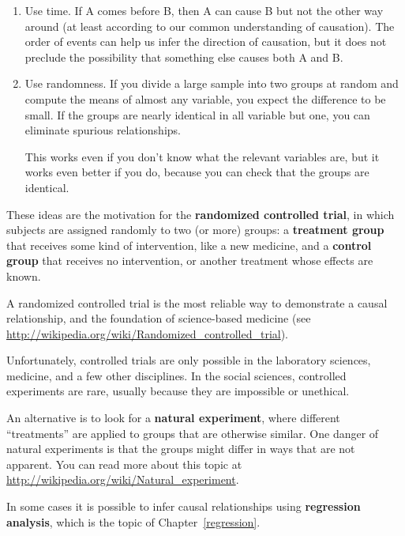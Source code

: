 \documentclass[12pt]{book}
\begin{document}
\begin{enumerate}

\item Use time.  If A comes before B, then A can cause B but not the
  other way around (at least according to our common understanding of
  causation).  The order of events can help us infer the direction
  of causation, but it does not preclude the possibility that something
  else causes both A and B.

\item Use randomness.  If you divide a large sample into two
  groups at random and compute the means of almost any variable, you
  expect the difference to be small.
  If the groups are nearly identical in all variable but one, you
  can eliminate spurious relationships.

  This works even if you don't know what the relevant variables
  are, but it works even better if you do, because you can check that
  the groups are identical.

\end{enumerate}

These ideas are the motivation for the {\bf randomized controlled
trial}, in which subjects are assigned randomly to two (or more)
groups: a {\bf treatment group} that receives some kind of intervention,
like a new medicine, and a {\bf control group} that receives
no intervention, or another treatment whose effects are known.

A randomized controlled trial is the most reliable way to demonstrate
a causal relationship, and the foundation of science-based medicine
(see \url{http://wikipedia.org/wiki/Randomized_controlled_trial}).

Unfortunately, controlled trials are only possible in the laboratory
sciences, medicine, and a few other disciplines.  In the social sciences,
controlled experiments are rare, usually because they are impossible
or unethical.

An alternative is to look for a {\bf natural experiment}, where
different ``treatments'' are applied to groups that are otherwise
similar.  One danger of natural experiments is that the groups might
differ in ways that are not apparent.  You can read more about this
topic at \url{http://wikipedia.org/wiki/Natural_experiment}.

In some cases it is possible to infer causal relationships using {\bf
  regression analysis}, which is the topic of Chapter~\ref{regression}.
\end{document}
